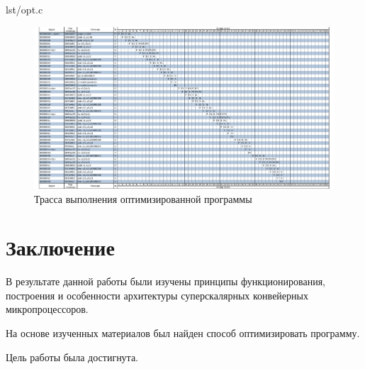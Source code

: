 \documentclass[a4paper,oneside,14pt]{extarticle}
\begin{document}
\begin{code}
\begin{lstinputlisting}[
        label={lst:1},
        language={C++},
        caption={Псевдокод оптимизированной программы по варианту}
    ]{lst/opt.c}
\end{lstinputlisting}
\end{code}

\begin{figure}[H]
	\centering
	\includegraphics[width=1\textwidth]{img/pipeline-optimized.pdf}
    \caption{Трасса выполнения оптимизированной программы}
	\label{fig:po}
\end{figure}

\newpage

\section{Заключение}

В результате данной работы были изучены принципы функционирования, построения и особенности архитектуры суперскалярных конвейерных микропроцессоров.

На основе изученных материалов был найден способ оптимизировать программу.

Цель работы была достигнута.
\end{document}
